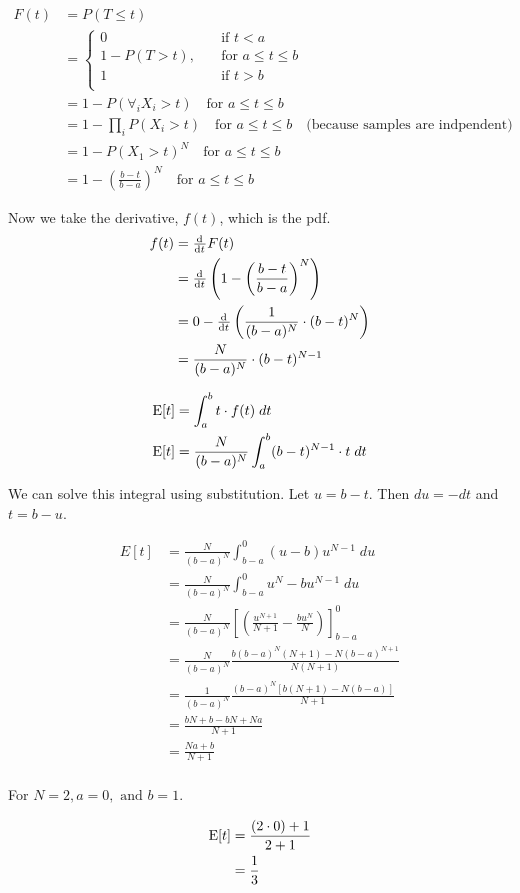\documentclass{article}
\begin{document}
\begin{align*}
F(t) &= P(T \le t) \\
     &= \begin{cases}
       0 & \quad \text{if } t < a \\
       1 - P(T > t), & \quad \text{for } a \le t \le b \\
       1 & \quad \text{if } t > b \\
     \end{cases} \\
     &= 1 - P(\forall_iX_i > t) \quad \text{for } a \le t \le b\\
     &= 1 - \prod_i P(X_i > t) \quad \text{for } a \le t \le b
       \quad \text{(because samples are indpendent)}\\
     &= 1 - P(X_1 > t)^N \quad \text{for } a \le t \le b\\
     &= 1 - \left( \frac{b - t}{b - a} \right)^N \quad \text{for } a
       \le t \le b
\end{align*}

Now we take the derivative, $f(t)$, which is the pdf.
\begin{align*}
  f(t) &= \od{}{t} F(t) \\
       &= \od{}{t}\left(1 - \left( \frac{b - t}{b - a} \right)^{N}\right) \\
       &= 0 - \od{}{t} \left( \frac{1}{(b-a)^N} \cdot (b - t)^N \right)\\
       &= \frac{N}{(b-a)^N} \cdot (b - t)^{N-1}
\end{align*}

\begin{align*}
   \mathrm{E}[t] &= \int_a^b t \cdot f(t) \; dt \\
   \mathrm{E}[t] &= \frac{N}{(b-a)^N} \int_a^b (b - t)^{N-1} \cdot t \; dt \\
\end{align*}

We can solve this integral using substitution. Let $u = b - t$. Then
$du = -dt$ and $t = b - u$.

\begin{align*}
  E[t] &= \frac{N}{(b-a)^N} \int_{b-a}^0 (u-b) u^{N-1} \; du \\
       &= \frac{N}{(b-a)^N} \int_{b-a}^0 u^N - bu^{N-1} \; du\\
       &= \frac{N}{(b-a)^N} \left[ \left( \frac{u^{N+1}}{N+1} -
         \frac{bu^N}{N} \right) \right]_{b-a}^0 \\
       &= \frac{N}{(b-a)^N} \frac{b(b-a)^N(N+1) -
         N(b-a)^{N+1}}{N(N+1)} \\
       &= \frac{1}{(b-a)^N} \frac{(b-a)^N \left[ b(N+1) - N(b-a)
         \right]}{N+1} \\
       &= \frac{bN + b -bN + Na}{N+1} \\
       &= \frac{Na + b}{N+1} \\
\end{align*}

For $N = 2, a = 0, \text{ and } b = 1$.

\begin{align*}
         \mathrm{E}[t] &= \frac{(2 \cdot 0) + 1}{2 + 1} \\
               &= \frac{1}{3}
\end{align*}
\end{document}

